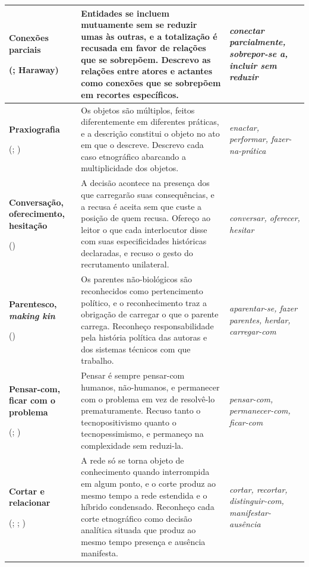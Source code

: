 \begin{longtable}{m{3.2cm} m{8.4cm} >{\itshape}m{2.4cm}}
    \hline
    \textbf{Conexões parciais} \par (\textcite{strathern2005partial}; Haraway) & Entidades se incluem mutuamente sem se reduzir umas às outras, e a totalização é recusada em favor de relações que se sobrepõem. Descrevo as relações entre atores e actantes como conexões que se sobrepõem em recortes específicos. & conectar parcialmente, sobrepor-se a, incluir sem reduzir \\
    \hline
    \textbf{Praxiografia} \par (\textcite{mol2002body}; \textcite{Law2004After}) & Os objetos são múltiplos, feitos diferentemente em diferentes práticas, e a descrição constitui o objeto no ato em que o descreve. Descrevo cada caso etnográfico abarcando a multiplicidade dos objetos. & enactar, performar, fazer-na-prática \\
    \hline
    \textbf{Conversação, oferecimento, hesitação} \par (\textcite{stengers2010cosmopolitics1, stengers2018another}) & A decisão acontece na presença dos que carregarão suas consequências, e a recusa é aceita sem que custe a posição de quem recusa. Ofereço ao leitor o que cada interlocutor disse com suas especificidades históricas declaradas, e recuso o gesto do recrutamento unilateral. & conversar, oferecer, hesitar \\
    \hline
    \textbf{Parentesco, \textit{making kin}} \par (\textcite{Haraway2023Ficar}) & Os parentes não-biológicos são reconhecidos como pertencimento político, e o reconhecimento traz a obrigação de carregar o que o parente carrega. Reconheço responsabilidade pela história política das autoras e dos sistemas técnicos com que trabalho. & aparentar-se, fazer parentes, herdar, carregar-com \\
    \hline
    \textbf{Pensar-com, ficar com o problema} \par (\textcite{Haraway2023Ficar}; \textcite{stengers2018another}) & Pensar é sempre pensar-com humanos, não-humanos, e permanecer com o problema em vez de resolvê-lo prematuramente. Recuso tanto o tecnopositivismo quanto o tecnopessimismo, e permaneço na complexidade sem reduzi-la. & pensar-com, permanecer-com, ficar-com \\
    \hline
    \textbf{Cortar e relacionar} \par (\textcite{strathern2011cortando}; \textcite{Law2004After}; \textcite{Barad2007Meeting}) & A rede só se torna objeto de conhecimento quando interrompida em algum ponto, e o corte produz ao mesmo tempo a rede estendida e o híbrido condensado. Reconheço cada corte etnográfico como decisão analítica situada que produz ao mesmo tempo presença e ausência manifesta. & cortar, recortar, distinguir-com, manifestar-ausência \\

\end{longtable}
